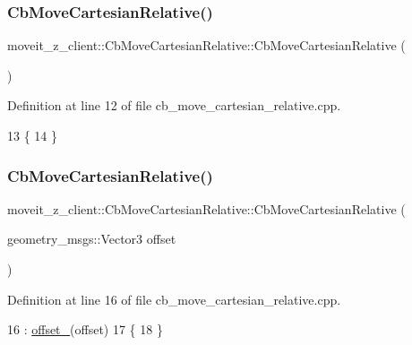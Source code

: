 \subsubsection{\texorpdfstring{Cb\+Move\+Cartesian\+Relative()}{CbMoveCartesianRelative()}\hspace{0.1cm}{\footnotesize\ttfamily [1/2]}}
{\footnotesize\ttfamily moveit\+\_\+z\+\_\+client\+::\+Cb\+Move\+Cartesian\+Relative\+::\+Cb\+Move\+Cartesian\+Relative (\begin{DoxyParamCaption}{ }\end{DoxyParamCaption})}



Definition at line 12 of file cb\+\_\+move\+\_\+cartesian\+\_\+relative.\+cpp.


\begin{DoxyCode}
13 \{
14 \}
\end{DoxyCode}
\mbox{\label{classmoveit__z__client_1_1CbMoveCartesianRelative_a07c04dffa04c5cd30d46109ed2167932}} 
\subsubsection{\texorpdfstring{Cb\+Move\+Cartesian\+Relative()}{CbMoveCartesianRelative()}\hspace{0.1cm}{\footnotesize\ttfamily [2/2]}}
{\footnotesize\ttfamily moveit\+\_\+z\+\_\+client\+::\+Cb\+Move\+Cartesian\+Relative\+::\+Cb\+Move\+Cartesian\+Relative (\begin{DoxyParamCaption}\item[{geometry\+\_\+msgs\+::\+Vector3}]{offset }\end{DoxyParamCaption})}



Definition at line 16 of file cb\+\_\+move\+\_\+cartesian\+\_\+relative.\+cpp.


\begin{DoxyCode}
16                                                                             : 
      \hyperlink{classmoveit__z__client_1_1CbMoveCartesianRelative_aa5316f2f734336722a353a8e9addea95}{offset\_}(offset)
17 \{
18 \}
\end{DoxyCode}


